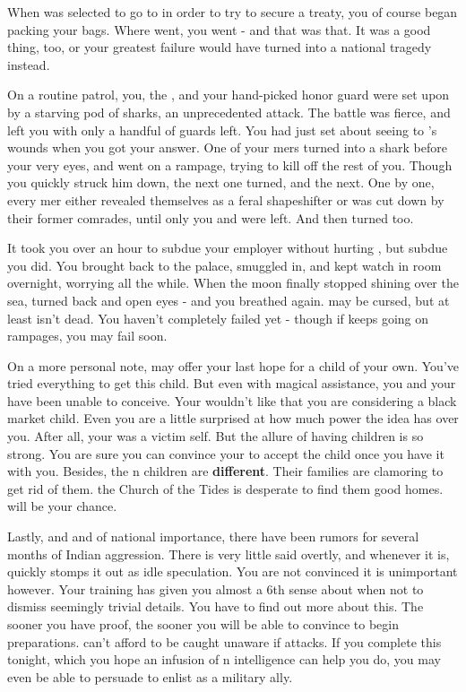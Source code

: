 \documentclass[char]{NeptuneBall}
\begin{document}
When \cPrince{} was selected to go to \pAtlantis{} in order to try to secure a treaty, you of course began packing your bags. Where \cPrince{\they} went, you went - and that was that. It was a good thing, too, or your greatest failure would have turned into a national tragedy instead.

On a routine patrol, you, the \cPrince{\prince}, and your hand-picked honor guard were set upon by a starving pod of sharks, an unprecedented attack. The battle was fierce, and left you with only a handful of guards left. You had just set about seeing to \cPrince{}'s wounds when you got your answer. One of your mers turned into a shark before your very eyes, and went on a rampage, trying to kill off the rest of you. Though you quickly struck him down, the next one turned, and the next. One by one, every mer either revealed themselves as a feral shapeshifter or was cut down by their former comrades, until only you and \cPrince{} were left. And then \cPrince{\they} turned too.

It took you over an hour to subdue your employer without hurting \cPrince{\them}, but subdue you did. You brought \cPrince{\them} back to the palace, smuggled \cPrince{\them} in, and kept watch in \cPrince{\their} room overnight, worrying all the while. When the moon finally stopped shining over the sea, \cPrince{\they} turned back and open \cPrince{\their} eyes - and you breathed again. \cPrince{} may be cursed, but at least \cPrince{\they} isn't dead. You haven't completely failed yet - though if \cPrince{} keeps going on rampages, you may fail soon.

On a more personal note, \pAtlantis{} may offer your last hope for a child of your own.  You've tried everything to get this child. But even with magical assistance, you and your \cVHusband{\spouse} have been unable to conceive. Your \cVHusband{\spouse} wouldn't like that you are considering a black market child. Even you are a little surprised at how much power the idea has over you. After all, your \cSpy{\sibling} was a victim \cSpy{\them}self. But the allure of having children is so strong.  You are sure you can convince your \cVHusband{\spouse} to accept the child once you have it with you. Besides, the \pAtlantis{}n children are {\bf different}. Their families are clamoring to get rid of them. the Church of the Tides is desperate to find them good homes. \cPriest{} will be your chance.

Lastly, and and of national importance, there have been rumors for several months of Indian aggression. There is very little said overtly, and whenever it is, \cPrince{} quickly stomps it out as idle speculation. You are not convinced it is unimportant however. Your training has given you almost a 6th sense about when not to dismiss seemingly trivial details.  You have to find out more about this. The sooner you have proof, the sooner you will be able to convince \cPrince{} to begin preparations. \pPacifica{} can't afford to be caught unaware if \pIndia{} attacks.  If you complete this tonight, which you hope an infusion of \pAtlantis{}n intelligence can help you do, you may even be able to persuade \cPrince{} to enlist \pAtlantis{} as a military ally.
\end{document}

